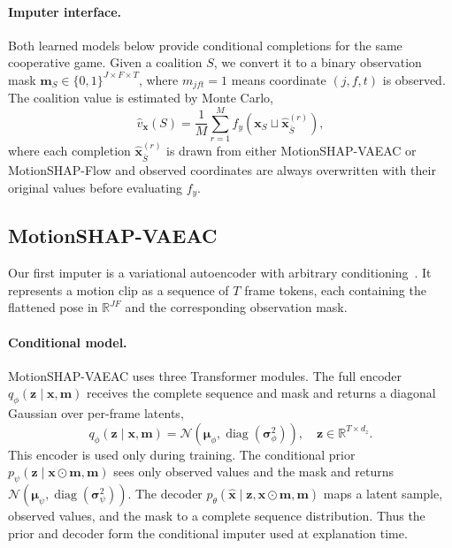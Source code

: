 \paragraph{Imputer interface.}
Both learned models below provide conditional completions for the same cooperative game.  Given a coalition $S$, we convert it to a binary observation mask $\mathbf{m}_S\in\{0,1\}^{J\times F\times T}$, where $m_{jft}=1$ means coordinate $(j,f,t)$ is observed.  The coalition value is estimated by Monte Carlo,
\begin{equation}
  \widehat{v}_{\mathbf{x}}(S)
  =
  \frac{1}{M}\sum_{r=1}^{M}
  f_y\!\left(
    \mathbf{x}_S\sqcup\hat{\mathbf{x}}_{\bar S}^{(r)}
  \right),
  \label{eq:vfn_mc}
\end{equation}
where each completion $\hat{\mathbf{x}}_{\bar S}^{(r)}$ is drawn from either MotionSHAP-VAEAC or MotionSHAP-Flow and observed coordinates are always overwritten with their original values before evaluating $f_y$.

\subsection{MotionSHAP-VAEAC}
\label{sec:architecture}

Our first imputer is a variational autoencoder with arbitrary conditioning~\citep{ivanov2018variational,olsen2022using}.  It represents a motion clip as a sequence of $T$ frame tokens, each containing the flattened pose in $\mathbb{R}^{JF}$ and the corresponding observation mask.

\paragraph{Conditional model.}
MotionSHAP-VAEAC uses three Transformer modules.  The full encoder
$q_\phi(\mathbf{z}\mid \mathbf{x},\mathbf{m})$ receives the complete sequence and mask and returns a diagonal Gaussian over per-frame latents,
\[
q_\phi(\mathbf{z}\mid \mathbf{x},\mathbf{m})
=
\mathcal{N}\!\left(\boldsymbol{\mu}_\phi,\operatorname{diag}(\boldsymbol{\sigma}^2_\phi)\right),
\quad
\mathbf{z}\in\mathbb{R}^{T\times d_z}.
\]
This encoder is used only during training.  The conditional prior
$p_\psi(\mathbf{z}\mid \mathbf{x}\odot\mathbf{m},\mathbf{m})$ sees only observed values and the mask and returns
$\mathcal{N}(\boldsymbol{\mu}_\psi,\operatorname{diag}(\boldsymbol{\sigma}^2_\psi))$.  The decoder $p_\theta(\hat{\mathbf{x}}\mid \mathbf{z},\mathbf{x}\odot\mathbf{m},\mathbf{m})$ maps a latent sample, observed values, and the mask to a complete sequence distribution.  Thus the prior and decoder form the conditional imputer used at explanation time.

